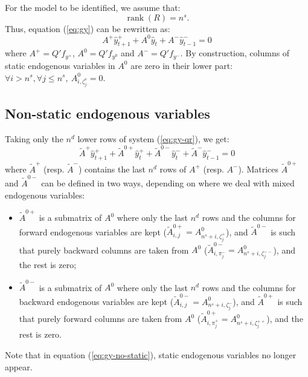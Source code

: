\documentclass[11pt,a4paper]{article}
\begin{document}
For the model to be identified, we assume that:
\begin{equation}
  \label{eq:identification}
  \mathop{rank}(R) = n^s.
\end{equation}
Thus, equation (\ref{eq:gy}) can be rewritten as:
\begin{equation}
  \label{eq:gy-qr}
  A^+ \hat{y}^+_{t+1} + A^0 \hat{y}_t + A^- \hat{y}^-_{t-1} = 0
\end{equation}
where $A^+ = Q'f_{y^+}$, $A^0 = Q'f_{y^0}$ and $A^- = Q'f_{y^-}$. By
construction, columns of static endogenous variables in $A^0$ are zero in their
lower part: $\forall i > n^s,\forall j\leq n^s, \: A^0_{i,\zeta^s_j} = 0$.

\subsection{Non-static endogenous variables}

Taking only the $n^d$ lower rows of system (\ref{eq:gy-qr}), we get:
\begin{equation}
  \label{eq:gy-no-static}
  \tilde{A}^+ \hat{y}^+_{t+1} + \tilde{A}^{0+} \hat{y}^+_t + \tilde{A}^{0-} \hat{y}^-_t + \tilde{A}^- \hat{y}^-_{t-1} = 0
\end{equation}
where $\tilde{A}^+$ (resp. $\tilde{A}^-$) contains the last $n^d$ rows of $A^+$
(resp. $A^-$). Matrices $\tilde{A}^{0+}$ and $\tilde{A}^{0-}$ can be defined in
two ways, depending on where we deal with mixed endogenous variables:

\begin{itemize}
\item $\tilde{A}^{0+}$ is a submatrix of $A^0$ where only the last $n^d$ rows
  and the columns for forward endogenous variables are kept
  ($\tilde{A}^{0+}_{i,j} = A^0_{n^s+i, \zeta^+_j}$), and $\tilde{A}^{0-}$ is
  such that purely backward columns are taken from $A^0$
  ($\tilde{A}^{0-}_{i,\pi^-_j} = A^0_{n^s+i,\zeta^{--}_j}$), and the rest is
  zero;
\item $\tilde{A}^{0-}$ is a submatrix of $A^0$ where only the last $n^d$ rows
  and the columns for backward endogenous variables are kept
  ($\tilde{A}^{0-}_{i,j} = A^0_{n^s+i, \zeta^-_j}$), and $\tilde{A}^{0+}$ is
  such that purely forward columns are taken from $A^0$
  ($\tilde{A}^{0+}_{i,\pi^+_j} = A^0_{n^s+i,\zeta^{++}_j}$), and the rest is
  zero.
\end{itemize}
Note that in equation (\ref{eq:gy-no-static}), static endogenous variables no
longer appear.
\end{document}
